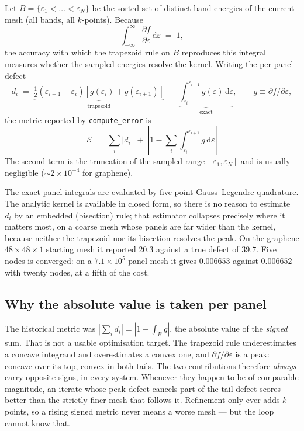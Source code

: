 \documentclass[11pt,a4paper]{article}
\newcommand{\dfda}{\partial f/\partial\varepsilon}
\newcommand{\code}[1]{\texttt{#1}}
\begin{document}
Let $B=\{\varepsilon_1<\dots<\varepsilon_N\}$ be the sorted set of distinct
band energies of the current mesh (all bands, all $k$-points). Because
\begin{equation}
  \int_{-\infty}^{\infty} \frac{\partial f}{\partial\varepsilon}\,
  \mathrm{d}\varepsilon \;=\; 1 ,
  \label{eq:sumrule}
\end{equation}
the accuracy with which the trapezoid rule on $B$ reproduces this integral
measures whether the sampled energies resolve the kernel. Writing the
per-panel defect
\begin{equation}
  d_i \;=\; \underbrace{\tfrac{1}{2}\left(\varepsilon_{i+1}-\varepsilon_i\right)
            \left[g(\varepsilon_i)+g(\varepsilon_{i+1})\right]}_{\text{trapezoid}}
       \;-\; \underbrace{\int_{\varepsilon_i}^{\varepsilon_{i+1}}
            g(\varepsilon)\,\mathrm{d}\varepsilon}_{\text{exact}},
  \qquad g \equiv \dfda ,
  \label{eq:defect}
\end{equation}
the metric reported by \code{compute\_error} is
\begin{equation}
  \boxed{\;
  \mathcal{E} \;=\; \sum_i \left|d_i\right|
              \;+\; \left|1-\sum_i \int_{\varepsilon_i}^{\varepsilon_{i+1}}
                    g\,\mathrm{d}\varepsilon\right| \; }
  \label{eq:metric}
\end{equation}
The second term is the truncation of the sampled range $[\varepsilon_1,
\varepsilon_N]$ and is usually negligible ($\sim 2\times10^{-4}$ for
graphene).

The exact panel integrals are evaluated by five-point Gauss--Legendre
quadrature. The analytic kernel is available in closed form, so there is no
reason to estimate $d_i$ by an embedded (bisection) rule; that estimator
collapses precisely where it matters most, on a coarse mesh whose panels are
far wider than the kernel, because neither the trapezoid nor its bisection
resolves the peak. On the graphene $48\times48\times1$ starting mesh it
reported $20.3$ against a true defect of $39.7$. Five nodes is converged: on a
$7.1\times10^{5}$-panel mesh it gives $0.006653$ against $0.006652$ with
twenty nodes, at a fifth of the cost.

\subsection{Why the absolute value is taken per panel}

The historical metric was $\left|\sum_i d_i\right| = \left|1-\int_B
g\right|$, the absolute value of the \emph{signed} sum. That is not a usable
optimisation target. The trapezoid rule underestimates a concave integrand and
overestimates a convex one, and $\dfda$ is a peak: concave over its top,
convex in both tails. The two contributions therefore \emph{always} carry
opposite signs, in every system. Whenever they happen to be of comparable
magnitude, an iterate whose peak defect cancels part of the tail defect scores
better than the strictly finer mesh that follows it. Refinement only ever adds
$k$-points, so a rising signed metric never means a worse mesh --- but the
loop cannot know that.
\end{document}
